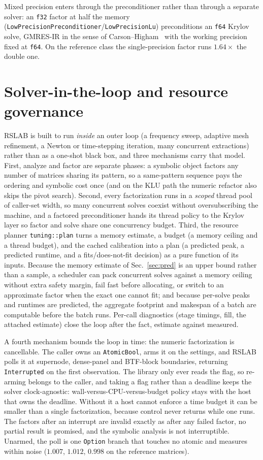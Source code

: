 \documentclass[11pt,a4paper]{article}
\newcommand{\rT}{\textsf{RSLAB}}
\newcommand{\code}[1]{\texttt{\small #1}}
\begin{document}
Mixed precision enters through the preconditioner rather than through a separate
solver: an \code{f32} factor at half the memory
(\code{LowPrecisionPreconditioner}/\code{LowPrecisionLu}) preconditions an
\code{f64} Krylov solve, GMRES-IR in the sense of Carson--Higham~\cite{carsonhigham}
with the working precision fixed at \code{f64}. On the reference class the
single-precision factor runs $1.64\times$ the double one.

\section{Solver-in-the-loop and resource governance}
\label{sec:sil}
\rT{} is built to run \emph{inside} an outer loop (a frequency sweep, adaptive mesh
refinement, a Newton or time-stepping iteration, many concurrent extractions) rather
than as a one-shot black box, and three mechanisms carry that model. First, analyze and
factor are separate phases: a symbolic object factors any number of matrices sharing its
pattern, so a same-pattern sequence pays the ordering and symbolic cost once (and on the
KLU path the numeric refactor also skips the pivot search). Second, every factorization
runs in a \emph{scoped} thread pool of caller-set width, so many concurrent solves
coexist without oversubscribing the machine, and a factored preconditioner hands its
thread policy to the Krylov layer so factor and solve share one concurrency budget.
Third, the resource planner \code{tuning::plan} turns a memory estimate, a budget (a
memory ceiling and a thread budget), and the cached calibration into a plan (a
predicted peak, a predicted runtime, and a fits/does-not-fit decision) as a pure
function of its inputs. Because the memory estimate of Sec.~\ref{sec:pred} is an upper
bound rather than a sample, a scheduler can pack concurrent solves against a memory
ceiling without extra safety margin, fail fast before allocating, or switch to an
approximate factor when the exact one cannot fit; and because per-solve peaks and
runtimes are predicted, the aggregate footprint and makespan of a batch are computable
before the batch runs. Per-call diagnostics (stage timings, fill, the attached estimate)
close the loop after the fact, estimate against measured.

A fourth mechanism bounds the loop in time: the numeric factorization is
cancellable. The caller owns an \code{AtomicBool}, arms it on the settings, and
\rT{} polls it at supernode, dense-panel and BTF-block boundaries, returning
\code{Interrupted} on the first observation. The library only ever reads the
flag, so re-arming belongs to the caller, and taking a flag rather than a
deadline keeps the solver clock-agnostic: wall-versus-CPU-versus-budget policy
stays with the host that owns the deadline. Without it a host cannot enforce a
time budget it can be smaller than a single factorization, because control never
returns while one runs. The factors after an interrupt are invalid exactly as
after any failed factor, no partial result is promised, and the symbolic
analysis is not interruptible. Unarmed, the poll is one \code{Option} branch
that touches no atomic and measures within noise ($1.007$, $1.012$, $0.998$ on
the reference matrices).
\end{document}

